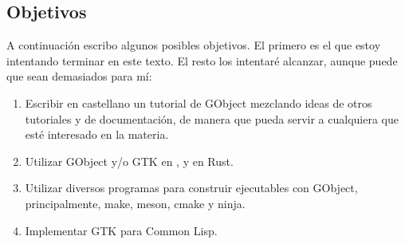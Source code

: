 \subsection{Objetivos} \label{subsec:objetivos}
A continuación escribo algunos posibles objetivos. El primero es el que estoy
intentando terminar en este texto. El resto los intentaré alcanzar, aunque puede
que sean demasiados para mí:
\vspace{-\topsep}
\begin{enumerate}
  \tightlist
\item Escribir en castellano un tutorial de \textsf{GObject} mezclando ideas de otros
  tutoriales y de documentación, de manera que pueda servir a cualquiera que esté
  interesado en la materia.
\item Utilizar \textsf{GObject} y/o \textsf{GTK} en ,   y en
  \textsf{Rust}.
\item Utilizar diversos programas para construir ejecutables con \textsf{GObject},
  principalmente, \textsf{make}, \textsf{meson}, \textsf{cmake} y \textsf{ninja}.
\item Implementar GTK para Common Lisp.
\end{enumerate}

